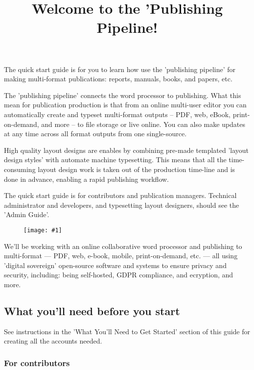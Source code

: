 \documentclass{article}
\newlength{\imgwidth}
\newcommand\scaledgraphics[2]{%
                
\settowidth{\imgwidth}{\texttt{[image: \#1]}}%
                
\setlength{\imgwidth}{\minof{\imgwidth}{#2\textwidth}}%
                
\texttt{[image: \#1]}%
                
}
\begin{document}
\title{Welcome to the 'Publishing Pipeline!}

\maketitle


The quick start guide is for you to learn how use the 'publishing pipeline' for making multi-format publications: reports, manuals, books, and papers, etc.


The 'publishing pipeline' connects the word processor to publishing. What this mean for publication production is that from an online multi-user editor you can automatically create and typeset multi-format outputs – PDF, web, eBook, print-on-demand, and more – to file storage or live online. You can also make updates at any time across all format outputs from one single-source. 


High quality layout designs are enables by combining pre-made templated 'layout design styles' with automate machine typesetting. This means that all the time-consuming layout design work is taken out of the production time-line and is done in advance, enabling a rapid publishing workflow.


The quick start guide is for contributors and publication managers. Technical administrator and developers, and typesetting layout designers, should see the 'Admin Guide'.

\begin{figure}
\scaledgraphics{b3bc6ba5-db38-4ec8-89db-45c029fdb485.png}{1}
\label{F98934631}
\end{figure}


We'll be working with an online collaborative word processor and publishing to multi-format — PDF, web, e-book, mobile, print-on-demand, etc. — all using 'digital sovereign' open-source software and systems to ensure privacy and security, including: being self-hosted, GDPR compliance, and ecryption, and more.


\subsection{What you'll need before you start}\label{H4632171}



See instructions in the 'What You'll Need to Get Started' section of this guide for creating all the accounts needed.


\subsubsection{For contributors}\label{H5614484}
\end{document}
